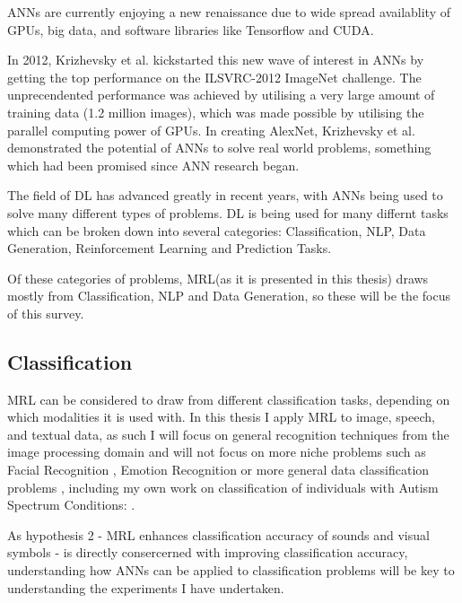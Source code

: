 \acp{ANN} are currently enjoying a new renaissance due to wide spread availablity of \acp{GPU}, big data, and software libraries like Tensorflow and CUDA.

In 2012, Krizhevsky et al. \cite{krizhevsky2012imagenet} kickstarted this new wave of interest in \acp{ANN} by getting the top performance on the ILSVRC-2012 ImageNet challenge. The unprecendented performance was achieved by utilising a very large amount of training data (1.2 million images), which was made possible by utilising the parallel computing power of \acp{GPU}. In creating AlexNet, Krizhevsky et al. demonstrated the potential of \acp{ANN} to solve real world problems, something which had been promised since \ac{ANN} research began.

The field of \ac{DL} has advanced greatly in recent years, with \acp{ANN} being used to solve many different types of problems. \ac{DL} is being used for many differnt tasks which can be broken down into several categories: Classification, \ac{NLP}, Data Generation, Reinforcement Learning \cite{vinyals2019alphastar} and Prediction Tasks.


Of these categories of problems, \ac{MRL}(as it is presented in this thesis) draws mostly from Classification, \ac{NLP} and Data Generation, so these will be the focus of this survey.

\subsection{Classification}
\ac{MRL} can be considered to draw from different classification tasks, depending on which modalities it is used with. In this thesis I apply \ac{MRL} to image, speech, and textual data, as such I will focus on general recognition techniques from the image processing domain and will not focus on more niche problems such as Facial Recognition \cite{ma2004facial}, Emotion Recognition \cite{levi2015emotion} or more general data classification problems \cite{kussul2017deep,qi2017pointnet}, including my own work on classification of individuals with Autism Spectrum Conditions: \cite{lohan2016distinguishing, sheppard2017understanding, lohan2018toward}.

As hypothesis 2 - \ac{MRL} enhances classification accuracy of sounds and visual symbols - is directly consercerned with improving classification accuracy, understanding how \acp{ANN} can be applied to classification problems will be key to understanding the experiments I have undertaken.


